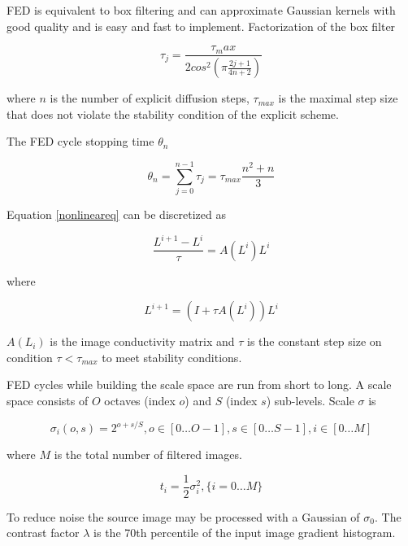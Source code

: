 \documentclass[english,12pt,a4paper,pdftex,elec,utf8]{aaltothesis}
\begin{document}
FED is equivalent to box filtering and can approximate Gaussian kernels with good quality and is easy and fast to implement. Factorization of the box filter

\begin{equation}
  \label{boxfilterfactor}
\tau_j = \frac{\tau_max}{2cos^2\left( \pi \frac{2j+1}{4n+2}\right)}
\end{equation}

where $n$ is the number of explicit diffusion steps, $\tau_{max}$ is the maximal step size that does not violate the stability condition of the explicit scheme.

The FED cycle stopping time $\theta_n$

\begin{equation}
\theta_n = \sum_{j=0}^{n-1}\tau_j=\tau_{max}\frac{n^2+n}{3}
\end{equation}

Equation \ref{nonlineareq} can be discretized as

\begin{equation}
  \label{discretenonlineareq}
\frac{L^{i+1}-L^i}{\tau}=A(L^i)L^i
\end{equation}

where

\begin{equation}
  \label{fednextevolution}
  L^{i+1}=(I + \tau A(L^i))L^i
\end{equation}

$A(L_i)$ is the image conductivity matrix and $\tau$ is the constant step size on condition $\tau < \tau_{max}$ to meet stability conditions.

FED cycles while building the scale space are run from short to long. A scale space consists of $O$ octaves (index $o$) and $S$ (index $s$) sub-levels. Scale $\sigma$ is

\begin{equation}
  \label{scalespace}
  \sigma_i(o,s) = 2^{o+s/S},o \in[0\ldots O-1], s \in [0\ldots S-1], i \in [0 \ldots M]
  \end{equation}

where $M$ is the total number of filtered images.

\begin{equation}
  \label{scaletotime}
t_i = \frac{1}{2}\sigma^2_i,\{i=0\ldots M\}
\end{equation}

To reduce noise the source image may be processed with a Gaussian of $\sigma_0$. The contrast factor $\lambda$ is the 70th percentile of the input image gradient histogram.
\end{document}

